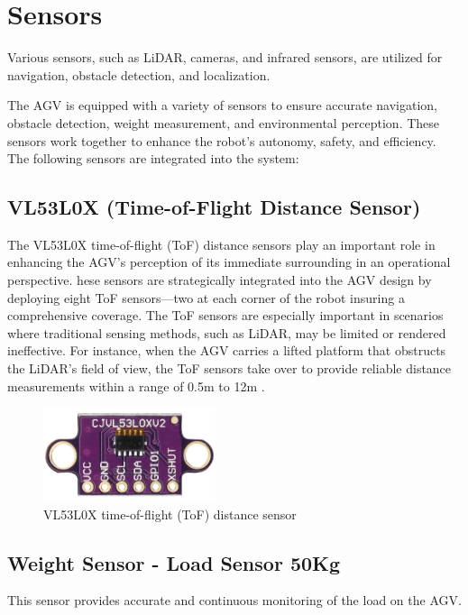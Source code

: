 \documentclass[../../main]{subfiles}
\begin{document}
\newpage
\section{Sensors}
Various sensors, such as LiDAR, cameras, and infrared sensors, are utilized for
navigation, obstacle detection, and localization.

The AGV is equipped with a variety of sensors to ensure accurate 
navigation, obstacle detection, weight measurement, and environmental 
perception. These sensors work together to enhance the robot's 
autonomy, safety, and efficiency. The following sensors are integrated 
into the system:

\subsection{VL53L0X (Time-of-Flight Distance Sensor)}

The VL53L0X time-of-flight (ToF) distance sensors  play an important role in enhancing 
the AGV's perception of its immediate surrounding in an operational perspective. 
hese sensors are strategically integrated into the AGV design by deploying eight 
ToF sensors—two at each corner of the robot insuring a comprehensive coverage. 
The ToF sensors are especially important in scenarios where traditional sensing methods, 
such as LiDAR, may be limited or rendered ineffective. For instance, when the AGV carries 
a lifted platform that obstructs the LiDAR's field of view, the ToF sensors take over to provide reliable distance measurements within a range of 0.5m to 12m . 
\begin{figure}[H]
    \centering
    \includegraphics[width=0.45\textwidth]{fig/tof_sensor.png}
    \caption{ VL53L0X time-of-flight (ToF) distance sensor }
    \label{LVL53L0X ToF sensor } %
\end{figure}


\subsection{Weight Sensor - Load Sensor 50Kg}

This sensor provides accurate and continuous monitoring of the load on the AGV.
\end{document}
